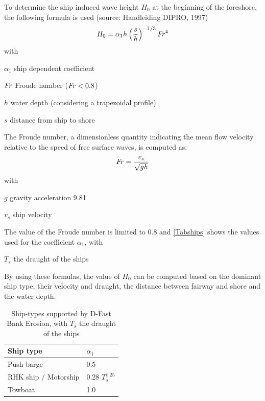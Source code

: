 To determine the ship induced wave height $H_0$  at the beginning of the foreshore, the following formula is used (source: Handleiding DIPRO, 1997)
%
\begin{equation}
H_0 = \alpha_1 h \left ( \frac{s}{h} \right )^{-1/3} \operatorname{\mathit{F\kern-.17em r}}^4
\end{equation}
%
with
%
\begin{symbollist}
\item[$\alpha_1$] ship dependent coefficient \unitbrackets{-}
\item[$\operatorname{\mathit{F\kern-.17em r}}$] Froude number ($\operatorname{\mathit{F\kern-.17em r}} < \text{0.8}$) \unitbrackets{-}
\item[$h$] water depth (considering a  trapezoidal profile) 
\item[$s$] distance from ship to shore 
\end{symbollist}
%
The Froude number, a dimensionless quantity indicating the mean flow velocity relative to the speed of free surface waves, is computed as:
%
\begin{equation}
\operatorname{\mathit{F\kern-.17em r}} = \frac{v_s}{\sqrt{g h}}
\end{equation}
%
with
%
\begin{symbollist}
\item[$g$] gravity acceleration 9.81 
\item[$v_s$] ship velocity 
\end{symbollist}

The value of the Froude number is limited to 0.8 and \autoref{Tabships} shows the values used for the coefficient $\alpha_1$, with 
\begin{symbollist}
	\item[$T_s$]  the draught of the ships 
\end{symbollist}


By using these formulas, the value of $H_0$ can be computed based on the dominant ship type, their velocity and draught, the distance between fairway and shore and the water depth.

\begin{table}[!h]
	\begin{tabular}{ll}
		Ship type & $\alpha_1$ \\ \hline
		Push barge & 0.5 \\
		RHK ship / Motorship & 0.28 $T_s^\text{1.25}$ \\
		Towboat & 1.0 \\ \hline
	\end{tabular}
	\caption{Ship-types supported by D-Fast Bank Erosion, with $T_s$  the draught of the ships}
	\label{Tabships}
\end{table}

